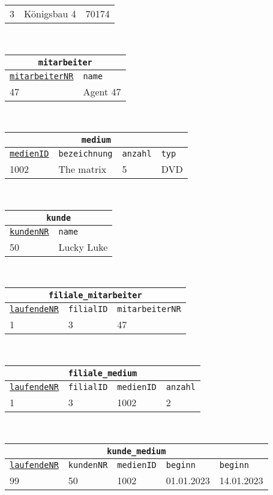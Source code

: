\begin{Answer}[ref=TabelleErstellen1]
\begin{enumerate}
\begin{tabular}{lll}
			\hline
			3&Königsbau 4&70174\\
		\end{tabular}\\
		\begin{tabular}{ll}
			\multicolumn{2}{c}{\lstinline!mitarbeiter!}\\
			\hline
			\underline{\lstinline!mitarbeiterNR!}&\lstinline!name!\\
			\hline
			47&Agent 47\\
		\end{tabular}\\
		\begin{tabular}{llll}
			\multicolumn{4}{c}{\lstinline!medium!}\\
			\hline
			\underline{\lstinline!medienID!}&\lstinline!bezeichnung!&\lstinline!anzahl!&\lstinline!typ!\\
			\hline
			1002&The matrix&5&DVD\\
		\end{tabular}\\
		\begin{tabular}{ll}
			\multicolumn{2}{c}{\lstinline!kunde!}\\
			\hline
			\underline{\lstinline!kundenNR!}&\lstinline!name!\\
			\hline
			50&Lucky Luke\\
		\end{tabular}\\
		\begin{tabular}{lll}
			\multicolumn{3}{c}{\lstinline!filiale_mitarbeiter!}\\
			\hline
			\underline{\lstinline!laufendeNR!}&\lstinline!filialID!&\lstinline!mitarbeiterNR!\\
			\hline
			1&3&47\\
		\end{tabular}\\
		\begin{tabular}{llll}
			\multicolumn{4}{c}{\lstinline!filiale_medium!}\\
			\hline
			\underline{\lstinline!laufendeNR!}&\lstinline!filialID!&\lstinline!medienID!&\lstinline!anzahl!\\
			\hline
			1&3&1002&2\\
		\end{tabular}\\
		\begin{tabular}{lllll}
			\multicolumn{5}{c}{\lstinline!kunde_medium!}\\
			\hline
			\underline{\lstinline!laufendeNR!}&\lstinline!kundenNR!&\lstinline!medienID!&\lstinline!beginn!&\lstinline!beginn!\\
			\hline
			99&50&1002&01.01.2023&14.01.2023\\
		\end{tabular}\\
	\end{enumerate}
\end{Answer}